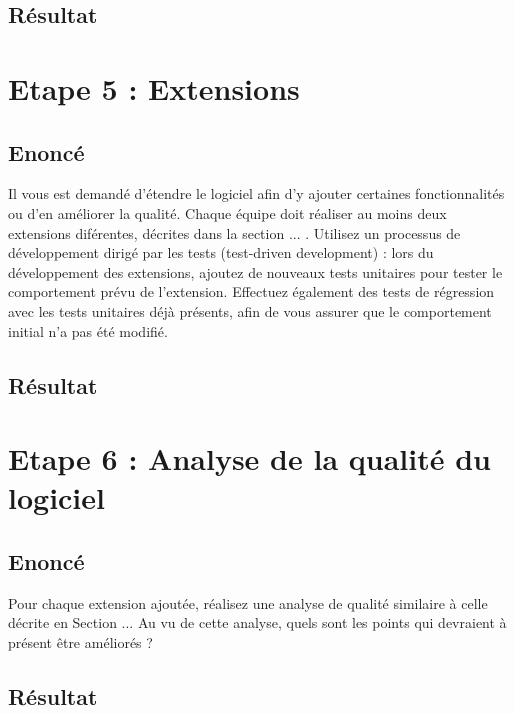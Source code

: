 \documentclass[12pt,a4paper,final]{article}
\begin{document}
\subsection{Résultat}



\newpage
\section{Etape 5 : Extensions}\label{sec:etape5}
\subsection{Enoncé} 
Il vous est demandé d'étendre le logiciel afin d'y ajouter certaines fonctionnalités ou d'en améliorer la qualité. Chaque équipe doit réaliser au moins deux extensions diférentes, décrites dans la section ... .
Utilisez un processus de développement dirigé par les tests (test-driven development) : lors du développement des extensions, ajoutez de nouveaux tests unitaires pour tester le comportement prévu de l'extension. Effectuez également des tests de régression avec les tests unitaires déjà présents, afin de vous assurer que le comportement initial n'a pas été modifié.
\subsection{Résultat}



\newpage
\section{Etape 6 : Analyse de la qualité du logiciel}\label{sec:etape6}
\subsection{Enoncé} 
Pour chaque extension ajoutée, réalisez une analyse de qualité similaire à celle décrite en Section ... Au vu de cette analyse, quels sont les points qui devraient à présent être améliorés ?
\subsection{Résultat}



\newpage
\end{document}
